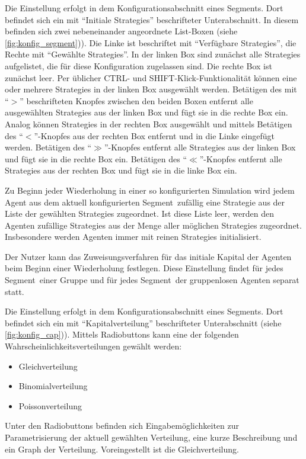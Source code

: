 \documentclass[parskip=full,11pt]{scrartcl}
\def\segment{Segment}
\begin{document}
Die Einstellung erfolgt in dem Konfigurationsabschnitt eines \segment s. Dort befindet sich ein mit \enquote{Initiale \Glspl{Strategie}} beschrifteter Unterabschnitt. In diesem befinden sich zwei nebeneinander angeordnete List-Boxen (siehe \cref{fig:konfig_segment})). Die Linke ist beschriftet mit \enquote{Verfügbare \Glspl{Strategie}}, die Rechte mit \enquote{Gewählte \Glspl{Strategie}}. In der linken Box sind zunächst alle \Glspl{Strategie} aufgelistet, die für diese Konfiguration zugelassen sind. Die rechte Box ist zunächst leer. Per üblicher \textsf{CTRL}- und \textsf{SHIFT}-Klick-Funktionalität können eine oder mehrere \Glspl{Strategie} in der linken Box ausgewählt werden. Betätigen des mit \enquote{\(>\)} beschrifteten Knopfes zwischen den beiden Boxen entfernt alle ausgewählten \Glspl{Strategie} aus der linken Box und fügt sie in die rechte Box ein. Analog können \Glspl{Strategie} in der rechten Box ausgewählt und mittels Betätigen des \enquote{\(<\)}-Knopfes aus der rechten Box entfernt und in die Linke eingefügt werden. Betätigen des \enquote{\(\gg\)}-Knopfes entfernt alle \Glspl{Strategie} aus der linken Box und fügt sie in die rechte Box ein. Betätigen des \enquote{\(\ll\)}-Knopfes entfernt alle \Glspl{Strategie} aus der rechten Box und fügt sie in die linke Box ein.

Zu Beginn jeder Wiederholung in einer so konfigurierten Simulation wird jedem Agent aus dem aktuell konfigurierten \segment\ zufällig eine \Gls{Strategie} aus der Liste der gewählten \Glspl{Strategie} zugeordnet. Ist diese Liste leer, werden den Agenten zufällige \Glspl{Strategie} aus der Menge aller möglichen \Glspl{Strategie} zugeordnet. Insbesondere werden Agenten immer mit reinen \Glspl{Strategie} initialisiert.

Der \Gls{Nutzer} kann das Zuweisungsverfahren für das initiale Kapital der Agenten beim Beginn einer Wiederholung festlegen. Diese Einstellung findet für jedes \segment\ einer Gruppe und für jedes \segment\ der gruppenlosen Agenten separat statt.

Die Einstellung erfolgt in dem Konfigurationsabschnitt eines \segment s. Dort befindet sich ein mit \enquote{Kapitalverteilung} beschrifteter Unterabschnitt (siehe \cref{fig:konfig_cap})). Mittels Radiobuttons kann eine der folgenden Wahrscheinlichkeitsverteilungen gewählt werden:
\begin{itemize}\itemsep -10pt
\item Gleichverteilung
\item Binomialverteilung
\item Poissonverteilung
\end{itemize}
Unter den Radiobuttons befinden sich Eingabemöglichkeiten zur Parametrisierung der aktuell gewählten Verteilung, eine kurze Beschreibung und ein Graph der Verteilung. Voreingestellt ist die Gleichverteilung.
\end{document}
